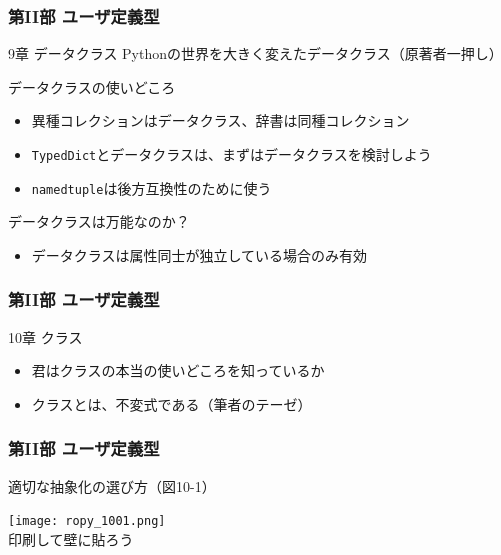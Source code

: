 \documentclass[aspectratio=169,dvipdfmx,12pt,notheorems]{beamer}
\theoremstyle{definition}
\begin{document}
\begin{frame}\frametitle{第II部 ユーザ定義型}

\begin{block}{9章 データクラス}
Pythonの世界を大きく変えたデータクラス（原著者一押し）
\end{block}

\begin{exampleblock}{データクラスの使いどころ}
\begin{itemize}
\item 異種コレクションはデータクラス、辞書は同種コレクション
\item \texttt{TypedDict}とデータクラスは、まずはデータクラスを検討しよう
\item \texttt{namedtuple}は後方互換性のために使う
\end{itemize}
\end{exampleblock}

\begin{alertblock}{データクラスは万能なのか？}
\begin{itemize}
\item データクラスは属性同士が独立している場合のみ有効
\end{itemize}
\end{alertblock}

\end{frame}

\begin{frame}\frametitle{第II部 ユーザ定義型}

\begin{block}{10章 クラス}
\begin{itemize}
\item 君はクラスの本当の使いどころを知っているか
\item クラスとは、不変式である（筆者のテーゼ）
\end{itemize}
\end{block}

\end{frame}

\begin{frame}\frametitle{第II部 ユーザ定義型}

\begin{block}{適切な抽象化の選び方（図10-1）}
\begin{center}
\texttt{[image: ropy\_1001.png]} \\
印刷して壁に貼ろう
\end{center}
\end{block}


\end{frame}
\end{document}
